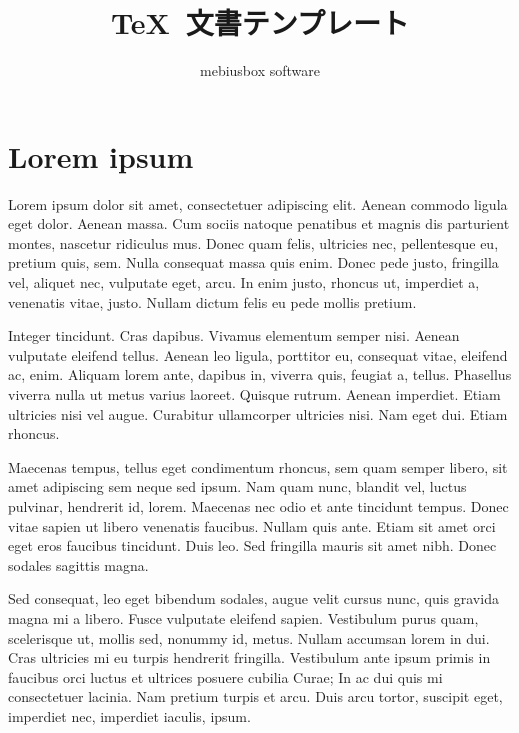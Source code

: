 \documentclass[a4paper,10pt]{ltjsarticle}
\title{\TeX\ 文書テンプレート}
\author{mebiusbox software}
\begin{document}
    \maketitle
    \setcounter{tocdepth}{2}

    \section{Lorem ipsum}

    Lorem ipsum dolor sit amet, consectetuer adipiscing elit. Aenean commodo ligula eget dolor. Aenean massa. Cum sociis natoque penatibus et magnis dis parturient montes, nascetur ridiculus mus. Donec quam felis, ultricies nec, pellentesque eu, pretium quis, sem. Nulla consequat massa quis enim. Donec pede justo, fringilla vel, aliquet nec, vulputate eget, arcu. In enim justo, rhoncus ut, imperdiet a, venenatis vitae, justo. Nullam dictum felis eu pede mollis pretium.

Integer tincidunt. Cras dapibus. Vivamus elementum semper nisi. Aenean vulputate eleifend tellus. Aenean leo ligula, porttitor eu, consequat vitae, eleifend ac, enim. Aliquam lorem ante, dapibus in, viverra quis, feugiat a, tellus. Phasellus viverra nulla ut metus varius laoreet. Quisque rutrum. Aenean imperdiet. Etiam ultricies nisi vel augue. Curabitur ullamcorper ultricies nisi. Nam eget dui. Etiam rhoncus.

Maecenas tempus, tellus eget condimentum rhoncus, sem quam semper libero, sit amet adipiscing sem neque sed ipsum. Nam quam nunc, blandit vel, luctus pulvinar, hendrerit id, lorem. Maecenas nec odio et ante tincidunt tempus. Donec vitae sapien ut libero venenatis faucibus. Nullam quis ante. Etiam sit amet orci eget eros faucibus tincidunt. Duis leo. Sed fringilla mauris sit amet nibh. Donec sodales sagittis magna.

Sed consequat, leo eget bibendum sodales, augue velit cursus nunc, quis gravida magna mi a libero. Fusce vulputate eleifend sapien. Vestibulum purus quam, scelerisque ut, mollis sed, nonummy id, metus. Nullam accumsan lorem in dui. Cras ultricies mi eu turpis hendrerit fringilla. Vestibulum ante ipsum primis in faucibus orci luctus et ultrices posuere cubilia Curae; In ac dui quis mi consectetuer lacinia. Nam pretium turpis et arcu. Duis arcu tortor, suscipit eget, imperdiet nec, imperdiet iaculis, ipsum.
\end{document}
